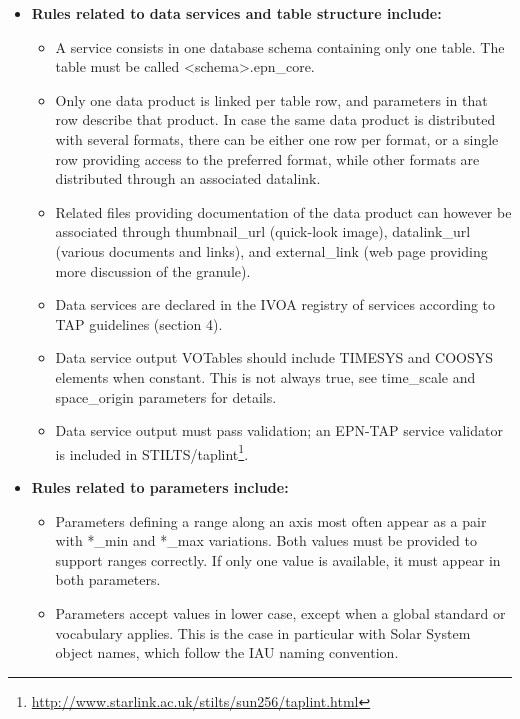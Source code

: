 \documentclass[11pt,a4paper]{ivoa}
\begin{document}
\begin{itemize}
\item \textbf{Rules related to data services and table structure include:}

\begin{itemize}
\item A service consists in one database schema containing only one table.
The table must be called <schema>.epn\_core.

\item Only one data product is linked per table row, and parameters
in that row describe that product. In case the same data product is 
distributed with several formats, there can be either one row per format, 
or a single row providing access to the preferred format, 
while other formats are distributed through an associated datalink.


\item Related files providing documentation of the data product can
however be associated through thumbnail\_{url} (quick-look image),
datalink\_url (various documents and links), and external\_link (web
page providing more discussion of the granule).

\item Data services are declared in the IVOA registry of services
according to TAP guidelines (section 4).

\item Data service output VOTables should include TIMESYS and COOSYS
elements when constant. This is not always true, see time\_scale  and
space\_origin parameters for details.

\item Data service output must pass validation;
an EPN-TAP service validator is included in
STILTS/taplint\footnote{\url{http://www.starlink.ac.uk/stilts/sun256/taplint.html}}.
\end{itemize}


\item \textbf{Rules related to parameters include:}

\begin{itemize}
\item Parameters defining a range along an axis most often appear as a
pair with *\_min and *\_max variations.  Both values must be provided
to support ranges correctly. If only one value is available, it must
appear in both parameters.

\item Parameters accept values in lower case, except when a global
standard or vocabulary applies. This is the case in particular with
Solar System object names, which follow the IAU naming convention.


\end{itemize}
\end{itemize}
\end{document}
